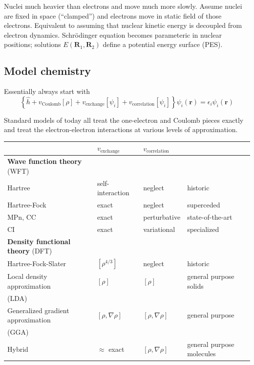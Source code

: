 \documentclass[11pt]{article}
\begin{document}
Nuclei much heavier than electrons and move much more slowly.  Assume nuclei are fixed in
space (``clamped'') and electrons move in static field of those electrons. Equivalent to
assuming that nuclear kinetic energy is decoupled from electron dynamics.
Schr\"{o}dinger equation becomes parameteric in nuclear positions; solutions
\(E(\mathbf{R}_{1},\mathbf{R}_{2})\) define a potential energy surface (PES).
\subsection{Model chemistry}
\label{sec:org64e5b2f}
Essentially always start with
\begin{equation}
\left \{ \hat{h} +v_{\text{Coulomb}}[\rho] + v_\text{exchange}[\psi_{i}] + v_\text{correlation}[\psi_{i}]\right\}\psi_i(\mathbf{r}) =\epsilon_i \psi_i(\mathbf{r})
\end{equation}

Standard models of today all treat the one-electron and Coulomb pieces exactly and treat
the electron-electron interactions at various levels of approximation.
\begin{center}
\begin{tabular}{llll}
\hline
 & \(v_{\text{exchange}}\) & \(v_{\text{correlation}}\) & \\
\hline
\textbf{Wave function theory} (WFT) &  &  & \\
Hartree & self-interaction & neglect & historic\\
Hartree-Fock & exact & neglect & superceded\\
MPn, CC & exact & perturbative & state-of-the-art\\
CI & exact & variational & specialized\\
\hline
\textbf{Density functional theory} (DFT) &  &  & \\
Hartree-Fock-Slater & \([\rho^{{4/3}}]\) & neglect & historic\\
Local density approximation & \([\rho]\) & \([\rho]\) & general purpose solids\\
(LDA) &  &  & \\
Generalized gradient approximation & \([\rho,\nabla\rho]\) & \([\rho,\nabla\rho]\) & general purpose\\
(GGA) &  &  & \\
Hybrid & \(\approx\) exact & \([\rho,\nabla\rho]\) & general purpose molecules\\
\hline
\end{tabular}
\end{center}
\end{document}
